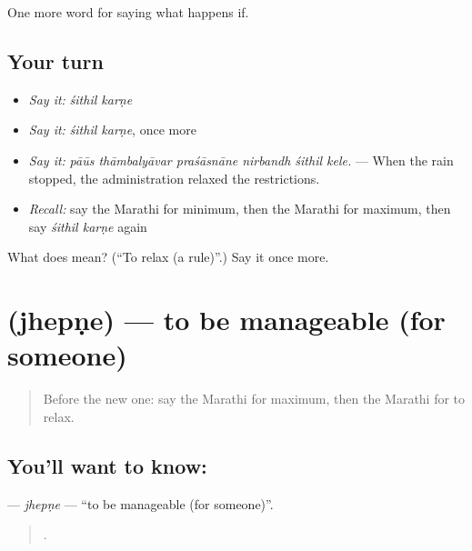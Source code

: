 \begin{grammarlens}[title={What you've built}]
One more word for saying what happens if.
\end{grammarlens}

\subsection*{Your turn}
\begin{itemize}
\raggedright
  \item \emph{Say it:} \emph{śithil karṇe}
  \item \emph{Say it:} \emph{śithil karṇe}, once more
  \item \emph{Say it:} \emph{pāūs thāmbalyāvar praśāsnāne nirbandh śithil kele.} — When the rain stopped, the administration relaxed the restrictions.
  \item \emph{Recall:} say the Marathi for minimum, then the Marathi for maximum, then say \emph{śithil karṇe} again
\end{itemize}

\begin{tcolorbox}[breakable,colback=teal!4,colframe=teal!35!black,title={Before you move on}]
What does   mean? (\textquotedblleft{}To relax (a rule)\textquotedblright{}.) Say it once more.
\end{tcolorbox}
\section[\texorpdfstring{\mr{झेपणे} (jhepṇe)}{झेपणे (jhepṇe)}]{ (jhepṇe) — to be manageable (for someone)}

\label{lesson:MR-C379-jhepne}



\begin{quote}
Before the new one: say the Marathi for maximum, then the Marathi for to relax.
\end{quote}

\subsection*{You'll want to know: }
\textbf{} — \emph{jhepṇe} — \textquotedblleft{}to be manageable (for someone)\textquotedblright{}.

\begin{quote}
     .
\end{quote}

